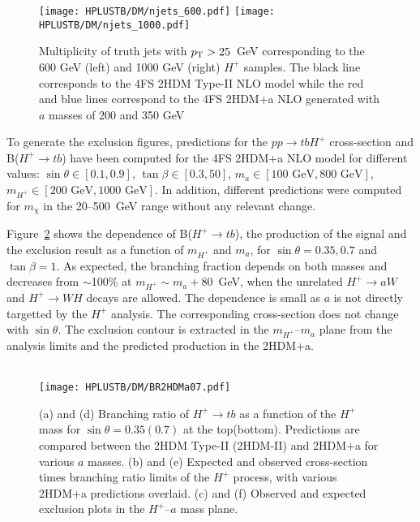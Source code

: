 \begin{figure}[htb]
    \RawFloats
    \centering
    \texttt{[image: HPLUSTB/DM/njets\_600.pdf]}
    \texttt{[image: HPLUSTB/DM/njets\_1000.pdf]}
    \caption{Multiplicity of truth jets with $p_{\text{T}}>25$~GeV corresponding to the 600 GeV (left) and 1000 GeV (right) $H^+$ samples. The black line corresponds to the 4FS 2HDM Type-II NLO model
    while the red and blue lines correspond to the 4FS 2HDM+a NLO generated with $a$ masses of 200 and 350 GeV}
    \label{Hplustb:2hdmatruth}
\end{figure}

To generate the exclusion figures, predictions for the $pp\to tbH^+$ cross-section and B($H^+\to tb$) have been computed for the 4FS 2HDM+a NLO model for different values: $\sin\theta\in[0.1,0.9]$, $\tan\beta\in[0.3,50]$, $m_a\in[100\text{ GeV},800\text{ GeV}]$, $m_{H^+}\in[200\text{ GeV},1000\text{ GeV}]$. In addition, different predictions were computed for $m_\chi$ in the 20--500~GeV range without any relevant change.

Figure~\ref{Hplustb:BRprodexclmassvsmass} shows the dependence of B($H^+\to tb$), the production of the signal and the exclusion result as a function of $m_{H^+}$ and $m_a$, for $\sin\theta=0.35,0.7$ and $\tan\beta=1$. As expected, the branching fraction depends on both masses and decreases from $\sim$100\% at $m_{H^+}\sim m_a+80$~GeV, when the unrelated $H^+\to aW$ and $H^+\to WH$ decays are allowed. The dependence is small as $a$ is not directly targetted by the $H^+$ analysis. The corresponding cross-section does not change with $\sin\theta$. The exclusion contour is extracted in the $m_{H^+}$--$m_a$ plane from the analysis limits and the predicted production in the 2HDM+a.

\begin{figure}[htb]
    \RawFloats
    \centering
        \\
       {\texttt{[image: HPLUSTB/DM/BR2HDMa07.pdf]}} 
    \caption{(a) and (d) Branching ratio of $H^+\to tb$ as a function of the $H^+$ mass for $\sin\theta=0.35(0.7)$ at the top(bottom). Predictions are compared between the 2HDM Type-II (2HDM-II) and 2HDM+a for various $a$ masses. (b) and (e) Expected and observed cross-section times branching ratio limits of the $H^+$ process, with various 2HDM+a predictions overlaid. (c) and (f) Observed and expected exclusion plots in the $H^+$--$a$ mass plane.}
    \label{Hplustb:BRprodexclmassvsmass}
\end{figure}

